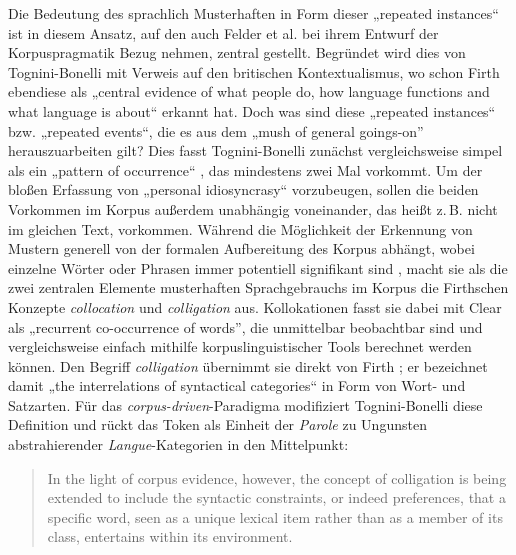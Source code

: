 Die Bedeutung des sprachlich Musterhaften in Form dieser „repeated instances`` ist in diesem Ansatz, auf den auch Felder et al. \autocite*[3-4]{felderKorpuspragmatikParadigmaZwischen2012} bei ihrem Entwurf der Korpuspragmatik Bezug nehmen, zentral gestellt. Begründet wird dies von Tognini-Bonelli mit Verweis auf den britischen Kontextualismus, wo schon Firth ebendiese als „central evidence of what people do, how language functions and what language is about`` \autocite[89]{tognini-bonelliCorpusLinguisticsWork2001} erkannt hat. Doch was sind diese „repeated instances`` bzw. „repeated events``, die es aus dem „mush of general goings-on'' \autocite[187]{firthPapersLinguistics193419511957} herauszuarbeiten gilt? Dies fasst Tognini-Bonelli zunächst vergleichsweise simpel als ein „pattern of occurrence`` \autocite*[89]{tognini-bonelliCorpusLinguisticsWork2001}, das mindestens zwei Mal vorkommt. Um der bloßen Erfassung von „personal idiosyncrasy`` vorzubeugen, sollen die beiden Vorkommen im Korpus außerdem unabhängig voneinander, das heißt z.\,B. nicht im gleichen Text, vorkommen. Während die Möglichkeit der Erkennung von Mustern generell von der formalen Aufbereitung des Korpus abhängt, wobei einzelne Wörter oder Phrasen immer potentiell signifikant sind \autocite[89]{tognini-bonelliCorpusLinguisticsWork2001}, macht sie als die zwei zentralen Elemente musterhaften Sprachgebrauchs im Korpus die Firthschen Konzepte \emph{collocation} und \emph{colligation} aus. Kollokationen fasst sie dabei mit Clear \autocite*[277]{clearFirthPrinciplesComputational1993} als „recurrent co-occurrence of words'', die unmittelbar beobachtbar sind und vergleichsweise einfach mithilfe korpuslinguistischer Tools berechnet werden können. Den Begriff \emph{colligation} übernimmt sie direkt von Firth \autocite*[23]{firthSelectedPapersFirth1968}; er bezeichnet damit „the interrelations of syntactical categories`` in Form von Wort- und Satzarten. Für das \emph{corpus-driven}-Paradigma modifiziert Tognini-Bonelli diese Definition und rückt das Token als Einheit der \emph{Parole} zu Ungunsten abstrahierender \emph{Langue}-Kategorien in den Mittelpunkt:

\begin{quote}
In the light of corpus evidence, however, the concept of colligation is being extended to include the syntactic constraints, or indeed preferences, that a specific word, seen as a unique lexical item rather than as a member of its class, entertains within its environment. \autocite[89]{tognini-bonelliCorpusLinguisticsWork2001}
\end{quote}

